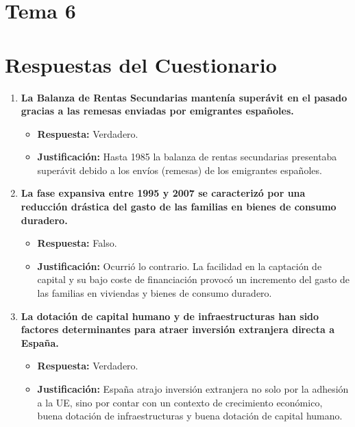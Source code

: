 \section{Tema 6}
\section*{Respuestas del Cuestionario}

\begin{enumerate}[label=\textbf{Pregunta \arabic*:}, leftmargin=*, itemsep=4ex]

\item \textbf{La Balanza de Rentas Secundarias mantenía superávit en el pasado gracias a las remesas enviadas por emigrantes españoles.}
    \begin{itemize}
        \item \textbf{Respuesta:} \textcolor{blue!80!black}{Verdadero.}
        \item \textbf{Justificación:} Hasta 1985 la balanza de rentas secundarias presentaba superávit debido a los envíos (remesas) de los emigrantes españoles.
    \end{itemize}

\item \textbf{La fase expansiva entre 1995 y 2007 se caracterizó por una reducción drástica del gasto de las familias en bienes de consumo duradero.}
    \begin{itemize}
        \item \textbf{Respuesta:} \textcolor{red!80!black}{Falso.}
        \item \textbf{Justificación:} Ocurrió lo contrario. La facilidad en la captación de capital y su bajo coste de financiación provocó un incremento del gasto de las familias en viviendas y bienes de consumo duradero.
    \end{itemize}

\item \textbf{La dotación de capital humano y de infraestructuras han sido factores determinantes para atraer inversión extranjera directa a España.}
    \begin{itemize}
        \item \textbf{Respuesta:} \textcolor{blue!80!black}{Verdadero.}
        \item \textbf{Justificación:} España atrajo inversión extranjera no solo por la adhesión a la UE, sino por contar con un contexto de crecimiento económico, buena dotación de infraestructuras y buena dotación de capital humano.
    \end{itemize}


\end{enumerate}
